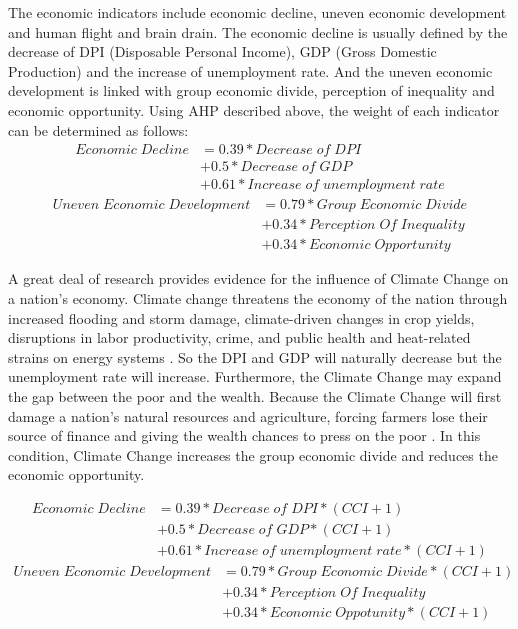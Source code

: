 \documentclass[a4paper,12pt]{article}
\begin{document}
The economic indicators include economic decline, uneven economic development and human flight and brain drain. The economic decline is usually defined by the decrease of DPI (Disposable Personal Income), GDP (Gross Domestic Production) and the increase of unemployment rate. And the uneven economic development is linked with group economic divide, perception of inequality and economic opportunity. Using AHP described above, the weight of each indicator can be determined as follows:
\begin{equation}
\begin{split}
Economic\;Decline&=0.39*Decrease\;of\;DPI\\&+0.5*Decrease\;of\;GDP\\ &+0.61*Increase\;of\;unemployment\;rate
\end{split}
\end{equation}
\begin{equation}
\begin{split}
Uneven\;Economic\;Development&=0.79*Group\;Economic\;Divide\\&+0.34*Perception\;Of\;Inequality\\&+0.34*Economic\;Opportunity
\end{split}
\end{equation}

A great deal of research provides evidence for the influence of Climate Change on a nation's economy. Climate change threatens the economy of the nation through increased flooding and storm damage, climate-driven changes in crop yields, disruptions in labor productivity, crime, and public health and heat-related strains on energy systems \citep{houser2015economic}. So the DPI and GDP will naturally decrease but the  unemployment rate will increase. Furthermore, the Climate Change may expand the gap between the poor and the wealth. Because the Climate Change will first damage a nation's natural resources and agriculture, forcing farmers lose their source of finance and giving the wealth chances to press on the poor \citep{Schwartz2003An}. In this condition, Climate Change increases the group economic divide and reduces the economic opportunity.

\begin{equation}
\label{eq12}
\begin{split}
Economic\;Decline&=0.39*Decrease\;of\;DPI*(CCI+1)\\&+0.5*Decrease\;of\;GDP*(CCI+1)\\ &+0.61*Increase\;of\;unemployment\;rate*(CCI+1)
\end{split}
\end{equation}
\begin{equation}
\label{eq13}
\begin{split}
Uneven\;Economic\;Development&=0.79*Group\;Economic\;Divide*(CCI+1)\\&+0.34*Perception\;Of\;Inequality\\&+0.34*Economic\;Oppotunity*(CCI+1)
\end{split}
\end{equation}
\end{document}
